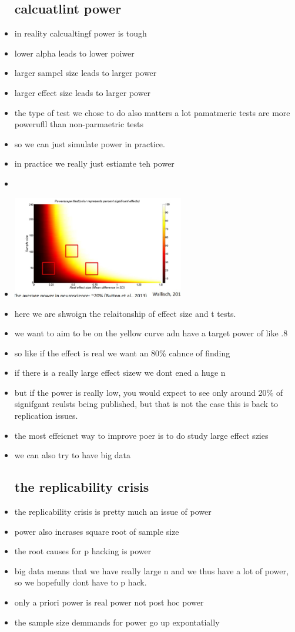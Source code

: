 \documentclass{article}
\begin{document}
\begin{itemize}
\subsection{calcuatlint power }
\item in reality calcualtingf power is tough 
\item lower alpha leads to lower poiwer 
\item larger sampel size leads to larger power 
\item larger effect size leads to larger power
\item the type of test we chose to do also matters a lot pamatmeric tests are more powerufll than non-parmaetric tests
\item so we can just simulate power in practice.
\item in practice we really just estiamte teh power
\item \item \includegraphics[width=7.5cm]{Final_Review/lecture_5/power scale .jpg} 
\item here we are shwoign the relaitonship of effect size and t tests.
\item we want to aim to be on the yellow curve adn have a target power of like .8
\item so like if the effect is real we want an 80\% cahnce of finding 
\item if there is a really large effect sizew we dont ened a huge n
\item but if the power is really low, you would expect to see only around 20\% of signifgant reulsts being published, but that is not the case this is back to replication issues.
\item the most effeicnet way to improve poer is to do study large effect szies
\item we can also try to have big data 
\subsection{the replicability crisis}
\item the replicability crisis is pretty much an issue of power
\item power also incrases square root of sample size
\item the root causes for p hacking is power
\item big data means that we have really large n and we thus have a lot of power, so we hopefully dont have to p hack. 
\item only a priori power is real power not post hoc power
\item the sample size demmands for power go up expontatially 

\end{itemize}
\end{document}
